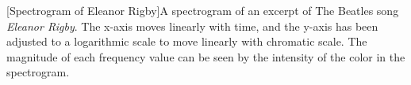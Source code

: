 [Spectrogram of Eleanor Rigby]A spectrogram of an excerpt of The Beatles song \textit{Eleanor Rigby}. The x-axis moves linearly with time, and the y-axis has been adjusted to a logarithmic scale to move linearly with chromatic scale. The magnitude of each frequency value can be seen by the intensity of the color in the spectrogram.